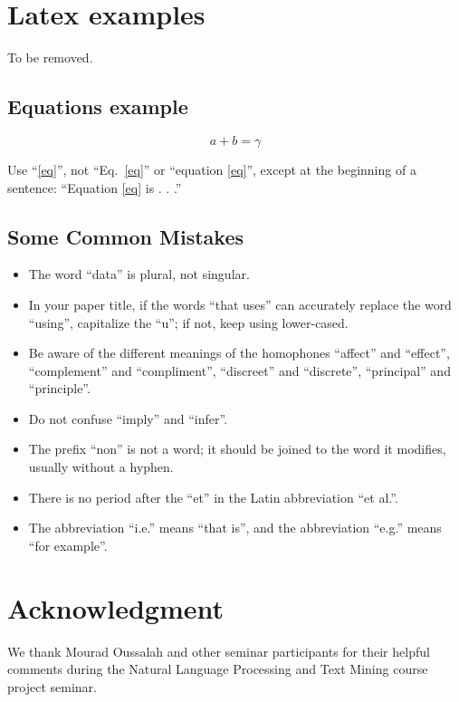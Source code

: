 \documentclass[conference]{IEEEtran}
\begin{document}
\section{Latex examples}

To be removed.

\subsection{Equations example}
\begin{equation}
a+b=\gamma\label{eq}
\end{equation}

Use ``\eqref{eq}'', not ``Eq.~\eqref{eq}'' or ``equation \eqref{eq}'', except at 
the beginning of a sentence: ``Equation \eqref{eq} is . . .''

\subsection{Some Common Mistakes}\label{SCM}
\begin{itemize}
\item The word ``data'' is plural, not singular.
\item In your paper title, if the words ``that uses'' can accurately replace the word ``using'', capitalize the ``u''; if not, keep using lower-cased.
\item Be aware of the different meanings of the homophones ``affect'' and ``effect'', ``complement'' and ``compliment'', ``discreet'' and ``discrete'', ``principal'' and ``principle''.
\item Do not confuse ``imply'' and ``infer''.
\item The prefix ``non'' is not a word; it should be joined to the word it modifies, usually without a hyphen.
\item There is no period after the ``et'' in the Latin abbreviation ``et al.''.
\item The abbreviation ``i.e.'' means ``that is'', and the abbreviation ``e.g.'' means ``for example''.
\end{itemize}




\section*{Acknowledgment}

We thank Mourad Oussalah and other seminar participants for their helpful comments during
 the Natural Language Processing and Text Mining course project seminar.
\end{document}
